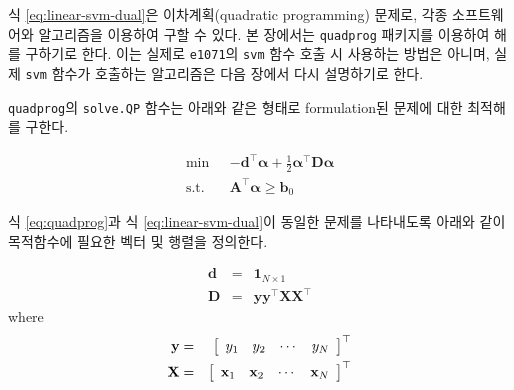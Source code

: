\documentclass[]{book}
\newenvironment{Shaded}{\begin{snugshade}}{\end{snugshade}}
\newcommand{\DecValTok}[1]{\textcolor[rgb]{0.00,0.00,0.81}{#1}}
\newcommand{\KeywordTok}[1]{\textcolor[rgb]{0.13,0.29,0.53}{\textbf{#1}}}
\newcommand{\NormalTok}[1]{#1}
\newcommand{\OperatorTok}[1]{\textcolor[rgb]{0.81,0.36,0.00}{\textbf{#1}}}
\newcommand{\StringTok}[1]{\textcolor[rgb]{0.31,0.60,0.02}{#1}}
\begin{document}
식 \eqref{eq:linear-svm-dual}은 이차계획(quadratic programming) 문제로, 각종 소프트웨어와 알고리즘을 이용하여 구할 수 있다. 본 장에서는 \texttt{quadprog} 패키지를 이용하여 해를 구하기로 한다. 이는 실제로 \texttt{e1071}의 \texttt{svm} 함수 호출 시 사용하는 방법은 아니며, 실제 \texttt{svm} 함수가 호출하는 알고리즘은 다음 장에서 다시 설명하기로 한다.

\texttt{quadprog}의 \texttt{solve.QP} 함수는 아래와 같은 형태로 formulation된 문제\citep{goldfarb1983numerically}에 대한 최적해를 구한다.

\begin{equation}
\begin{split}
\min \text{  } & -\mathbf{d}^{\top}\boldsymbol{\alpha} + \frac{1}{2} \boldsymbol{\alpha}^{\top}\mathbf{D}\boldsymbol{\alpha}\\
\text{s.t. } & \mathbf{A}^{\top}\boldsymbol{\alpha} \ge \mathbf{b}_0
\end{split}
\label{eq:quadprog}
\end{equation}

식 \eqref{eq:quadprog}과 식 \eqref{eq:linear-svm-dual}이 동일한 문제를 나타내도록 아래와 같이 목적함수에 필요한 벡터 및 행렬을 정의한다.

\begin{eqnarray*}
\mathbf{d} &=& \mathbf{1}_{N \times 1}\\
\mathbf{D} &=& \mathbf{y}\mathbf{y}^{\top}\mathbf{X}\mathbf{X}^{\top}
\end{eqnarray*}
where
\begin{eqnarray*}
\mathbf{y} &=& \left[ \begin{array}{c c c c} y_1 & y_2 & \cdots & y_N \end{array} \right]^\top\\
\mathbf{X} &=& \left[ \begin{array}{c c c c} \mathbf{x}_1 & \mathbf{x}_2 & \cdots & \mathbf{x}_N \end{array} \right]^{\top}
\end{eqnarray*}

\begin{Shaded}
\end{Shaded}
\end{document}
